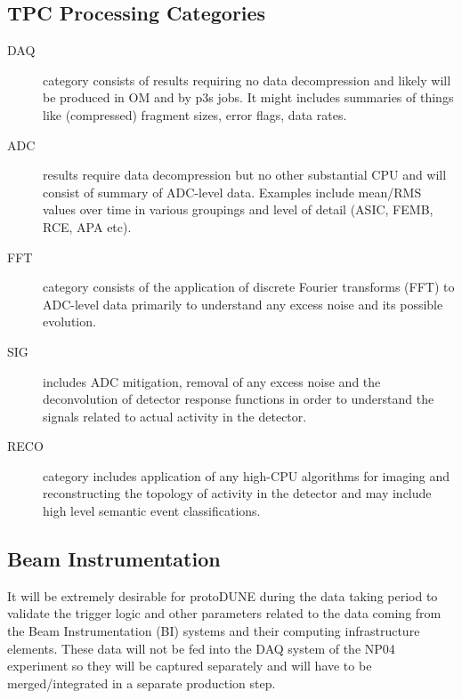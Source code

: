 \documentclass[pdftex,12pt,letter]{article}
\newcommand{\pd}{protoDUNE\xspace}
\begin{document}
\subsection{TPC Processing Categories}
\begin{description}

\item[DAQ] category consists of results requiring no data
  decompression and likely will be produced in OM and by p3s jobs.  It
  might includes summaries of things like (compressed) fragment sizes,
  error flags, data rates.

\item[ADC] results require data decompression but no other substantial
  CPU and will consist of summary of ADC-level data.  Examples include
  mean/RMS values over time in various groupings and level of detail
  (ASIC, FEMB, RCE, APA etc).

\item[FFT] category consists of the application of discrete Fourier
  transforms (FFT) to ADC-level data primarily to understand any
  excess noise and its possible evolution.

\item[SIG] includes ADC mitigation, removal of any excess noise and
  the deconvolution of detector response functions in order to
  understand the signals related to actual activity in the detector.

\item[RECO] category includes application of any high-CPU algorithms
  for imaging and reconstructing the topology of activity in the
  detector and may include high level semantic event classifications.

\end{description}

\subsection{Beam Instrumentation}
It will be extremely desirable for \pd during the data taking
period to validate the trigger logic and other
parameters related to the data coming from the Beam Instrumentation
(BI) systems and their computing infrastructure elements.
These data will not be fed into the DAQ system of the NP04
experiment so they will be captured separately and 
will have to be merged/integrated in a separate production
step.
\end{document}
